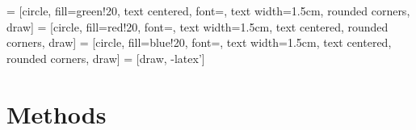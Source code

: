  = [circle,
                     fill=green!20,
                     text centered,
                     font=\ssmall,
                     text width=1.5cm,
                     rounded corners,
                     draw]
 = [circle,
                     fill=red!20,
                     font=\ssmall,
                     text width=1.5cm,
                     text centered,
                     rounded corners,
                     draw]
 = [circle,
                     fill=blue!20,
                     font=\ssmall,
                     text width=1.5cm,
                     text centered,
                     rounded corners,
                     draw]
 = [draw, -latex']
\newcommand{\Checkmark}{$\mathbin{\tikz [x=2.4ex, y=2.4ex, line width=.2ex, green] \draw (0,1) -- (1,0) -- (3,3);}$}
\section{Methods}
